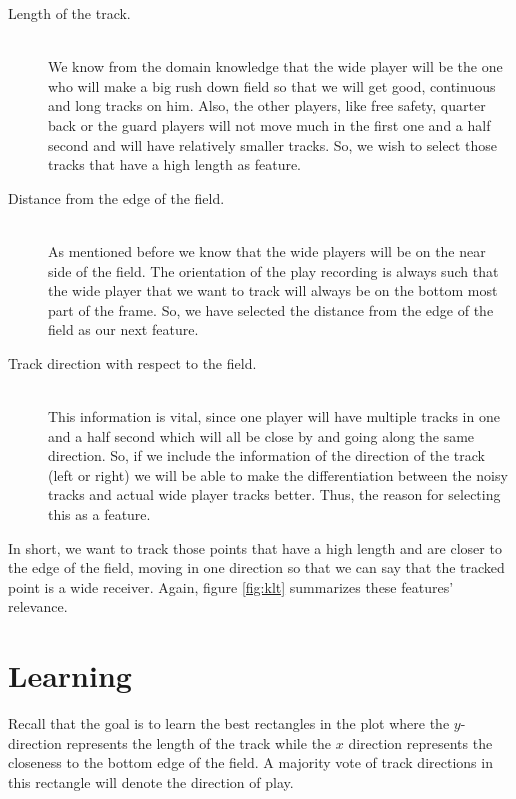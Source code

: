 \documentclass{article} %
\begin{document}
\begin{description}
	\item[Length of the track.] \hfill \\
	We know from the domain knowledge that the wide player will be the one who will make a big rush down field so that we will get good, continuous and long tracks on him. Also, the other players, like free safety, quarter back or the guard players will not move much in the first one and a half second and will have relatively smaller tracks. So, we wish to select those tracks that have a high length as feature.
	
	\item[Distance from the edge of the field.] \hfill \\
	As mentioned before we know that the wide players will be on the near side of the field. The orientation of the play recording is always such that the wide player that we want to track will always be on the bottom most part of the frame. So, we have selected the distance from the edge of the field as our next feature. 
	
	\item[Track direction with respect to the field.] \hfill \\
	This information is vital, since one player will have multiple tracks in one and a half second which will all be close by and going along the same direction. So, if we include the information of the direction of the track (left or right) we will be able to make the differentiation between the noisy tracks and actual wide player tracks better. Thus, the reason for selecting this as a feature.
	
\end{description}

In short, we want to track those points that have a high length and are closer to the edge of the field, moving in one direction so that we can say that the tracked point is a wide receiver. Again, figure \ref{fig:klt} summarizes these features' relevance.

\section{Learning}

Recall that the goal is to learn the best rectangles in the plot where the $y$-direction represents the length of the track while the $x$ direction represents the closeness to the bottom edge of the field. A majority vote of track directions in this rectangle will denote the direction of play.
\end{document}
